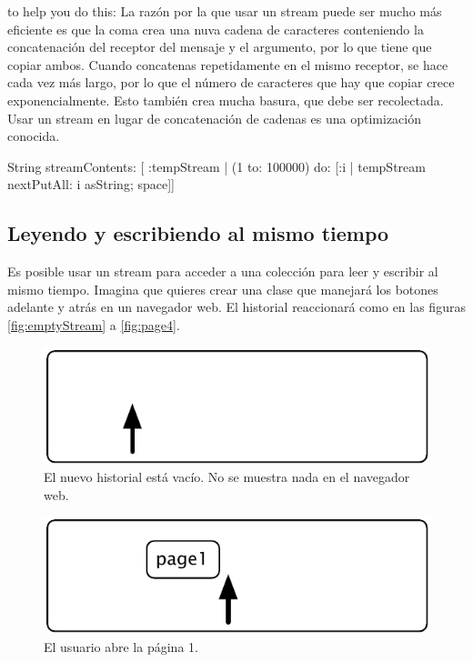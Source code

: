 \documentclass[a4paper,10pt,twoside]{book}
\begin{document}
{to help you do this:
La raz\'on por la que usar un stream puede ser mucho m\'as eficiente es que la coma crea una nuva cadena de caracteres conteniendo la concatenaci\'on del receptor del mensaje y el argumento, por lo que tiene que copiar ambos.
Cuando concatenas repetidamente en el mismo receptor, se hace cada vez m\'as largo, por lo que el n\'umero de caracteres que hay que copiar crece exponencialmente. 
Esto tambi\'en crea mucha basura, que debe ser recolectada. Usar un stream en lugar de concatenaci\'on de cadenas es una optimizaci\'on conocida.


\begin{code}{}
String streamContents: [ :tempStream |
  (1 to: 100000)
       do: [:i | tempStream nextPutAll: i asString; space]] 
\end{code}

\subsection{Leyendo y escribiendo al mismo tiempo}

Es posible usar un stream para acceder a una colecci\'on para leer y escribir al mismo tiempo. 
Imagina que quieres crear una clase  que manejar\'a los botones adelante y atr\'as en un navegador web.
El historial reaccionar\'a como en las figuras \ref{fig:emptyStream} a \ref{fig:page4}.

\begin{figure}[!ht]
\centerline{\includegraphics[scale=0.5]{emptyStef}}
\caption{El nuevo historial est\'a vac\'io. No se muestra nada en el navegador web.}
\vspace{.2in}
\end{figure}

\begin{figure}[!ht]
\centerline{\includegraphics[scale=0.5]{page1Stef}}
\caption{El usuario abre la p\'agina 1.}
\vspace{.2in}
\end{figure}

}
\end{document}
